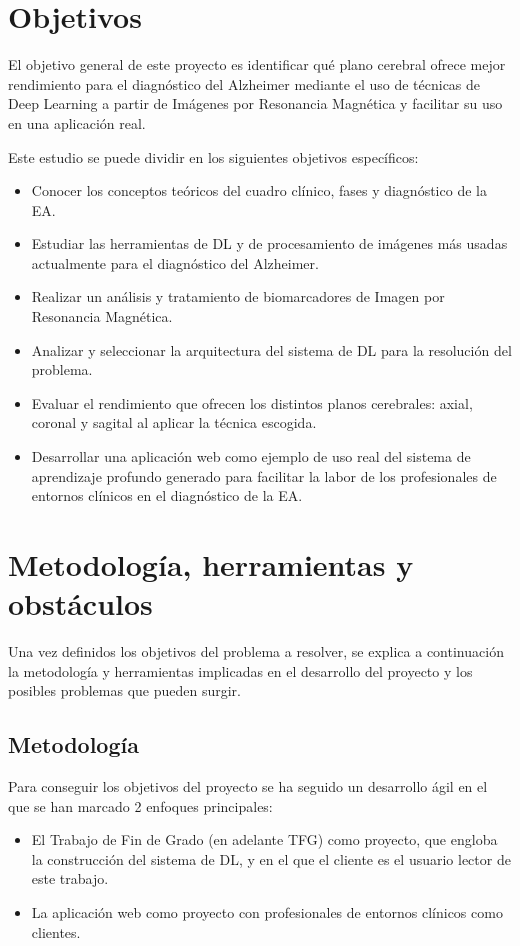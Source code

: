 \section{Objetivos}\label{sec:objetivos}
El objetivo general de este proyecto es identificar qué plano cerebral ofrece mejor rendimiento para el diagnóstico del
Alzheimer mediante el uso de técnicas de Deep Learning a partir de Imágenes por Resonancia Magnética y facilitar su uso
en una aplicación real.

Este estudio se puede dividir en los siguientes objetivos específicos:
\begin{itemize}
    \item Conocer los conceptos teóricos del cuadro clínico, fases y diagnóstico de la EA.
    \item Estudiar las herramientas de DL y de procesamiento de imágenes más usadas actualmente para el diagnóstico del
    Alzheimer.
    \item Realizar un análisis y tratamiento de biomarcadores de Imagen por Resonancia Magnética.
    \item Analizar y seleccionar la arquitectura del sistema de DL para la resolución del problema.
    \item Evaluar el rendimiento que ofrecen los distintos planos cerebrales: axial, coronal y sagital al aplicar la
    técnica escogida.
    \item Desarrollar una aplicación web como ejemplo de uso real del sistema de aprendizaje profundo generado para
    facilitar la labor de los profesionales de entornos clínicos en el diagnóstico de la EA.\\
\end{itemize}




\section{Metodología, herramientas y obstáculos}\label{sec:metodologia-herramientas-y-obstaculos}
Una vez definidos los objetivos del problema a resolver, se explica a continuación la metodología y herramientas
implicadas en el desarrollo del proyecto y los posibles problemas que pueden surgir.

\subsection{Metodología}\label{subsec:metodologia}
Para conseguir los objetivos del  proyecto se ha seguido un desarrollo ágil en el que se han marcado 2 enfoques
principales:
\begin{itemize}
    \item El Trabajo de Fin de Grado (en adelante TFG) como proyecto, que engloba la construcción del sistema de DL, y
    en el que el cliente es el usuario lector de este trabajo.
    \item La aplicación web como proyecto con profesionales de entornos clínicos como clientes.\\
\end{itemize}

